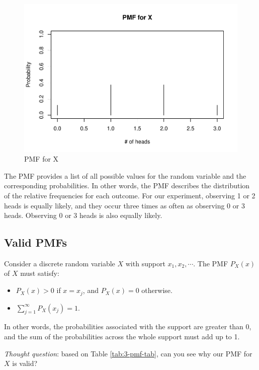 \documentclass[
]{book}
\providecommand{\tightlist}{%
  \setlength{\itemsep}{0pt}\setlength{\parskip}{0pt}}
\begin{document}
\begin{figure}
\centering
\includegraphics{bookdown-demo_files/figure-latex/3-pmf-1.pdf}
\caption{\label{fig:3-pmf}PMF for X}
\end{figure}

The PMF provides a list of all possible values for the random variable and the corresponding probabilities. In other words, the PMF describes the distribution of the relative frequencies for each outcome. For our experiment, observing 1 or 2 heads is equally likely, and they occur three times as often as observing 0 or 3 heads. Observing 0 or 3 heads is also equally likely.

\subsection{Valid PMFs}\label{valid-pmfs}

Consider a discrete random variable \(X\) with support \(x_1, x_2, \cdots\). The PMF \(P_X(x)\) of \(X\) must satisfy:

\begin{itemize}
\tightlist
\item
  \(P_X(x) > 0\) if \(x = x_j\), and \(P_X(x) = 0\) otherwise.
\item
  \(\sum_{j=1}^{\infty} P_X(x_j) = 1\).
\end{itemize}

In other words, the probabilities associated with the support are greater than 0, and the sum of the probabilities across the whole support must add up to 1.

\emph{Thought question}: based on Table \ref{tab:3-pmf-tab}, can you see why our PMF for \(X\) is valid?
\end{document}
